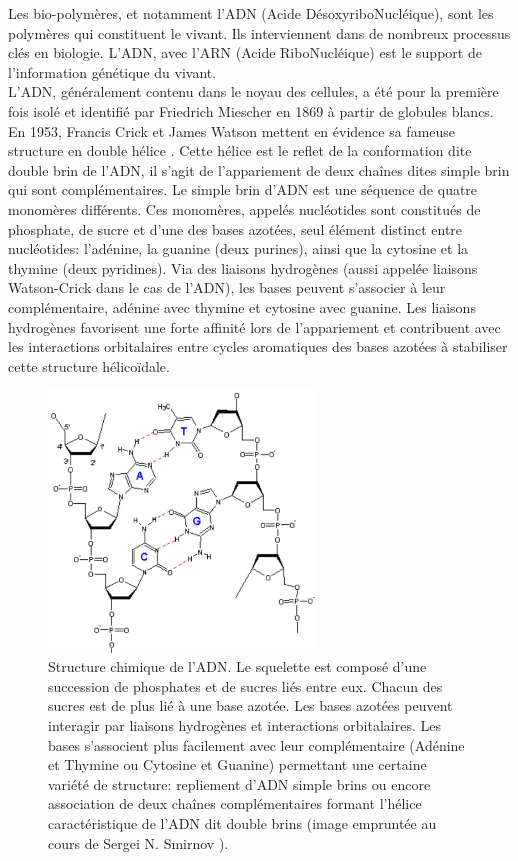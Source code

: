 Les bio-polymères, et notamment l'ADN (Acide DésoxyriboNucléique), sont les polymères qui constituent le vivant. Ils interviennent dans de nombreux processus clés en biologie.  L'ADN, avec l'ARN (Acide RiboNucléique) est le support de l'information génétique du vivant. \\

L'ADN, généralement contenu dans le noyau des cellules, a été pour la première fois isolé et identifié par Friedrich Miescher en 1869 à partir de globules blancs. En 1953, Francis Crick et James Watson mettent en évidence sa fameuse structure en double hélice \cite{watsoncrick}. Cette hélice est le reflet de la conformation dite double brin de l'ADN, il s'agit de l'appariement de deux chaînes dites simple brin qui sont complémentaires. Le simple brin d'ADN est une séquence de quatre monomères différents. Ces monomères, appelés nucléotides sont constitués de phosphate, de sucre et d'une des bases azotées, seul élément distinct entre nucléotides: l'adénine, la guanine (deux purines), ainsi que la cytosine et la thymine (deux pyridines). Via des liaisons hydrogènes (aussi appelée liaisons Watson-Crick dans le cas de l'ADN), les bases peuvent s'associer à leur complémentaire, adénine avec thymine et cytosine avec guanine. Les liaisons hydrogènes favorisent une forte affinité lors de l'appariement et contribuent avec les interactions orbitalaires entre cycles aromatiques des bases azotées à stabiliser cette structure hélicoïdale.

\begin{figure}[H]
\begin{center}
\includegraphics[width=0.63\textwidth]{adn.jpg}

\caption[Représentation de l'ADN]{Structure chimique de l'ADN. Le squelette est composé d'une succession de phosphates et de sucres liés entre eux. Chacun des sucres est de plus lié à une base azotée. Les bases azotées peuvent interagir par liaisons hydrogènes et interactions orbitalaires. Les bases s'associent plus facilement avec leur complémentaire (Adénine et Thymine ou Cytosine et Guanine) permettant une certaine variété de structure: repliement d'ADN simple brins ou encore association de deux cha\^{i}nes complémentaires formant l'hélice caractéristique de l'ADN dit double brins (image empruntée au cours de Sergei N. Smirnov \cite{adnjpg}).}
\label{adn}
\end{center}
\end{figure}

